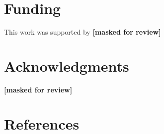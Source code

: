 \documentclass[
  man,mask,floatsintext]{apa6}
\begin{document}
\hypertarget{funding}{%
\section{Funding}\label{funding}}

This work was supported by \textbf{{[}masked for review{]}}

\hypertarget{acknowledgments}{%
\section{Acknowledgments}\label{acknowledgments}}

\textbf{{[}masked for review{]}}

\newpage

\hypertarget{references}{%
\section{References}\label{references}}
\end{document}
